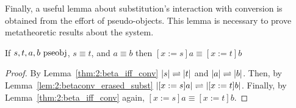 Finally, a useful lemma about substitution's interaction with conversion is obtained from the effort of pseudo-objects.
This lemma is necessary to prove metatheoretic results about the system.

\begin{lemma}
    If $s, t, a, b~\mbox{\normalfont pseobj}$, $s \equiv t$, and $a \equiv b$ then $[x := s]a \equiv [x := t]b$
    \label{lem:2:conv_subst}
\end{lemma}
\begin{proof}
    By Lemma~\ref{thm:2:beta_iff_conv} $|s| \rightleftharpoons |t|$ and $|a| \rightleftharpoons |b|$.
    Then, by Lemma~\ref{lem:2:betaconv_erased_subst} $|[x := s]a| \rightleftharpoons |[x := t]b|$.
    Finally, by Lemma~\ref{thm:2:beta_iff_conv} again, $[x := s]a \equiv [x := t]b$.
\end{proof}

